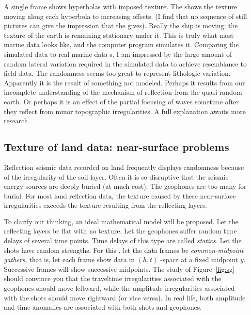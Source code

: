 

\par
A single frame shows hyperbolas with imposed texture.
The  shows the texture
moving along each hyperbola to increasing offsets.
(I find that no sequence of still pictures can
give the impression that the  gives).
Really the ship is moving; the texture of
the earth is remaining stationary under it.
This is truly what most marine data looks like,
and the computer program simulates it.
Comparing the simulated data to real marine-data s,
I am impressed by the large amount of random lateral variation required
in the simulated data to achieve resemblance to field data.
The randomness seems too great to represent lithologic variation.
Apparently it is the result of something not modeled.
Perhaps it results from our incomplete understanding of the
mechanism of reflection from the quasi-random earth.
Or perhaps it is an effect of the 
partial focusing of waves sometime after they
reflect from minor topographic irregularities.
A full explanation awaits more research.


\subsection{Texture of land data: near-surface problems}
\par
Reflection seismic data recorded on land frequently displays randomness
because of the irregularity of the soil layer.
Often it is so disruptive that the seismic energy sources are
deeply buried (at much cost).
The geophones are too many for burial.
For most land reflection data, the texture caused by these near-surface
irregularities exceeds the texture resulting from the reflecting layers.
\par
To clarify our thinking, an ideal mathematical model will be proposed.
Let the reflecting layers be flat with no texture.
Let the geophones suffer random time delays of several time points.
Time delays of this type are called
{\em statics.}
Let the shots have random strengths.
For this , let the data frames be
{\em 
common-midpoint gathers,
}
that is, let each frame show data in  $(h,t)$
-space at a fixed midpoint  $y$.
Successive frames will show successive midpoints.
The study of Figure~\ref{fig:sg} should convince you that the
traveltime irregularities associated with the geophones should
move leftward, while the amplitude irregularities associated with
the shots  should move rightward (or vice versa).
In real life, both amplitude and time anomalies are associated
with both shots and geophones.

